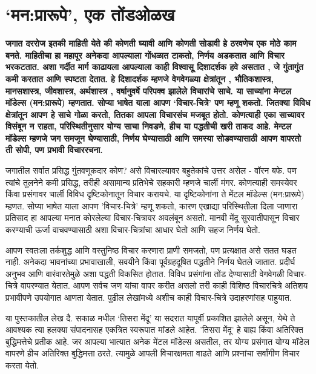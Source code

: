 \chapter{‘मन:प्रारूपे’, एक तोंडओळख}

\textcolor{blue!60!black}{\textbf{जगात दररोज इतकी माहिती येते की कोणती घ्यावी आणि कोणती सोडावी हे ठरवणेच एक मोठे काम बनते. माहितीचा हा महापूर अनेकदा आपल्याला गोंधळात टाकतो, निर्णय अडकतात आणि विचार भरकटतात. अशा गर्दीत मार्ग काढायला आपल्याला काही विश्वासू दिशादर्शक हवे असतात , जे गुंतागुंत कमी करतात आणि स्पष्टता देतात. हे दिशादर्शक म्हणजे वेगवेगळ्या क्षेत्रांतून , भौतिकशास्त्र, मानसशास्त्र, जीवशास्त्र, अर्थशास्त्र , वर्षानुवर्षे परिपक्व झालेले विचारांचे साचे. या साच्यांना मेन्टल मॉडेल्स (मन:प्रारूपे) म्हणतात. सोप्या भाषेत याला आपण ‘विचार-चित्रे’ पण म्हणू शकतो. जितक्या विविध क्षेत्रांतून आपण हे साचे गोळा करतो, तितका आपला विचारसंच मजबूत होतो. कोणत्याही एका साच्यावर विसंबून न राहता, परिस्थितीनुसार योग्य साचा निवडणे, हीच या पद्धतीची खरी ताकद आहे. मेन्टल मॉडेल्स म्हणजे जग समजून घेण्यासाठी, निर्णय घेण्यासाठी आणि समस्या सोडवण्यासाठी आपण वापरतो ती सोपी, पण प्रभावी विचाररचना.}}

जगातील सर्वात प्रसिद्ध गुंतवणूकदार कोण? असे विचारल्यावर बहुतेकांचे उत्तर असेल - वॉरन बफे. पण त्यांचे तुलनेने कमी प्रसिद्ध, तरीही असामान्य प्रतिभेचे सहकारी म्हणजे चार्ली मंगर. कोणत्याही समस्येवर किंवा प्रसंगावर चार्ली विविध दृष्टिकोनातून विचार करायचे. या दृष्टिकोनांना ते मेंटल मॉडेल्स (मन:प्रारूपे) म्हणत. सोप्या भाषेत याला आपण 'विचार-चित्रे' म्हणू शकतो, कारण एखाद्या परिस्थितीला दिला जाणारा प्रतिसाद हा आपल्या मनात कोरलेल्या विचार-चित्रावर अवलंबून असतो. मानवी मेंदू सुरवातीपासून  विचार करण्याची ऊर्जा वाचवण्यासाठी अशा विचार-चित्रांचा आधार घेतो आणि सहज निर्णय घेतो.

आपण स्वतःला तर्कशुद्ध आणि वस्तुनिष्ठ विचार करणारा प्राणी समजतो, पण प्रत्यक्षात असे सतत घडत नाही. अनेकदा भावनांच्या प्रभावाखाली, सवयीने किंवा पूर्वग्रहदूषित पद्धतीने निर्णय घेतले जातात. प्रदीर्घ अनुभव आणि वारंवारतेमुळे अशा पद्धती विकसित होतात. विविध प्रसंगांना तोंड देण्यासाठी वेगवेगळी विचार-चित्रे वापरण्यात येतात. आपण सर्वच जण यांचा वापर करीत असलो तरी काही विशिष्ठ विचारचित्रे अतिशय प्रभावीपणे उपयोगात आणता येतात. पुढील लेखांमध्ये अशीच काही विचार-चित्रे उदाहरणांसह पाहुयात.

या पुस्तकातील लेख दै. सकाळ मधील `तिसरा मेंदू' या सदरात यापूर्वी प्रकाशित झालेले असून, येथे ते आवश्यक त्या हलक्या संपादनासह एकत्रित स्वरूपात मांडले आहेत. 'तिसरा मेंदू'  हे बाह्य किंवा अतिरिक्त बुद्धिमत्तेचे प्रतीक आहे. जर आपल्या भात्यात अनेक मेंटल मॉडेल्स असतील, तर योग्य प्रसंगात योग्य मॉडेल वापरणे हीच अतिरिक्त बुद्धिमत्ता ठरते. त्यामुळे आपली विचारक्षमता वाढते आणि प्रश्नांचा सर्वांगीण विचार करता येतो.

